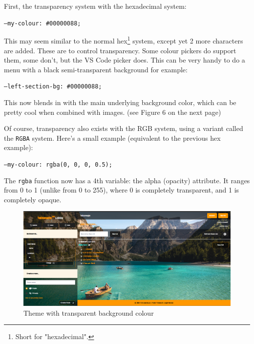 \documentclass{article}
\begin{document}
First, the transparency system with the hexadecimal system:
\begin{tcolorbox}[colback=green!5!white,colframe=green!75!black,title=Hexadecimal colour with transparency]
  \texttt{--my-colour: \#00000088;}
\end{tcolorbox}
This may seem similar to the normal hex\footnote{Short for "hexadecimal".} system, except yet 2 more characters are added. These are to control transparency. Some colour pickers do support them, some don't, but the VS Code picker does. This can be very handy to do a menu with a black semi-transparent background for example:
\begin{tcolorbox}[colback=green!5!white,colframe=green!75!black,title=Semi-transparent black panel background]
  \texttt{--left-section-bg: \#00000088;}
\end{tcolorbox}
This now blends in with the main underlying background color, which can be pretty cool when combined with images. (see Figure 6 on the next page)

Of course, transparency also exists with the RGB system, using a variant called the \texttt{RGBA} system. Here's a small example (equivalent to the previous hex example):
\begin{tcolorbox}[colback=green!5!white,colframe=green!75!black,title=\textcolor{red}{R}\textcolor{green}{G}\textcolor{blue}{B}\textcolor{gray}{A} (\textcolor{red}{Red} \textcolor{green}{Green} \textcolor{blue}{Blue} \textcolor{gray}{Alpha}) colour]
  \texttt{--my-colour: rgba(0, 0, 0, 0.5);}
\end{tcolorbox}
The \texttt{rgba} function now has a 4th variable: the alpha (opacity) attribute. It ranges from 0 to 1 (unlike from 0 to 255), where 0 is completely transparent, and 1 is completely opaque.

\begin{figure}
    \centering
    \includegraphics[width=1\linewidth]{6.png}
    \caption{Theme with transparent background colour}
    \label{fig:enter-label}
\end{figure}
\end{document}
